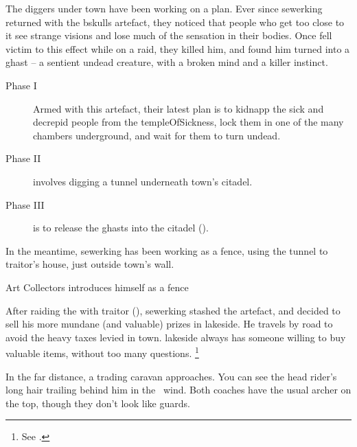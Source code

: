 \label{sewerking}

\noindent
\begin{exampletext}
  The \glspl{digger} under \gls{town} have been working on a plan.
  Ever since \gls{sewerking} returned with the \gls{bskulls} \gls{artefact}, they noticed that people who get too close to it see strange visions and lose much of the sensation in their bodies.
  Once  fell victim to this effect while on a raid, they killed him, and found him turned into a ghast -- a sentient undead creature, with a broken mind and a killer instinct.%

  \label{ghastPlan}
  \begin{description}
    \item[Phase I]
    Armed with this \gls{artefact}, their latest plan is to kidnapp the sick and decrepid people from the \gls{templeOfSickness}, lock them in one of the many chambers underground, and wait for them to turn undead.
    \item[Phase II]
    involves digging a tunnel underneath \gls{town}'s citadel.
    \item[Phase III]
    is to release the ghasts into the citadel ().
  \end{description}

  In the meantime, \gls{sewerking} has been working as a fence, using the tunnel to \gls{traitor}'s house, just outside \gls{town}'s wall.

\end{exampletext}

{Art Collectors}%
{ introduces himself as a fence}%

\begin{exampletext}
  After raiding the  with \gls{traitor} (), \gls{sewerking} stashed the \gls{artefact}, and decided to sell his more mundane (and valuable) prizes in \gls{lakeside}.
  He travels by road to avoid the heavy taxes levied in \gls{town}.%
  \Gls{lakeside} always has someone willing to buy valuable items, without too many questions.%
  \footnote{See .}
\end{exampletext}

\begin{boxtext}
  In the far distance, a trading caravan approaches.
  You can see the head rider's long hair trailing behind him in the \showTemperature\ wind.
  Both coaches have the usual archer on the top, though they don't look like \glspl{guard}.
\end{boxtext}

